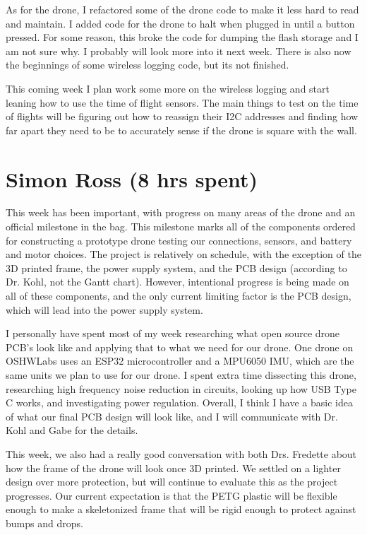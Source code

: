 \documentclass[12pt, titlepage]{article}
\begin{document}
As for the drone, I refactored some of the drone code to make it less hard to read and maintain. I added code for the drone to halt when plugged in until a button pressed. For some reason, this broke the code for dumping the flash storage and I am not sure why. I probably will look more into it next week. There is also now the beginnings of some wireless logging code, but its not finished.

This coming week I plan work some more on the wireless logging and start leaning how to use the time of flight sensors. The main things to test on the time of flights will be figuring out how to reassign their I2C addresses and finding how far apart they need to be to accurately sense if the drone is square with the wall.   


\section*{Simon Ross (8 hrs spent)}

This week has been important, with progress on many areas of the drone and an official milestone in the bag. This milestone marks all of the components ordered for constructing a prototype drone testing our connections, sensors, and battery and motor choices. The project is relatively on schedule, with the exception of the 3D printed frame, the power supply system, and the PCB design (according to Dr. Kohl, not the Gantt chart). However, intentional progress is being made on all of these components, and the only current limiting factor is the PCB design, which will lead into the power supply system.

I personally have spent most of my week researching what open source drone PCB's look like and applying that to what we need for our drone. One drone on OSHWLabs uses an ESP32 microcontroller and a MPU6050 IMU, which are the same units we plan to use for our drone. I spent extra time dissecting this drone, researching high frequency noise reduction in circuits,  looking up how USB Type C works, and investigating power regulation. Overall, I think I have a basic idea of what our final PCB design will look like, and I will communicate with Dr. Kohl and Gabe for the details. 

This week, we also had a really good conversation with both Drs. Fredette about how the frame of the drone will look once 3D printed. We settled on a lighter design over more protection, but will continue to evaluate this as the project progresses. Our current expectation is that the PETG plastic will be flexible enough to make a skeletonized frame that will be rigid enough to protect against bumps and drops.
\end{document}
